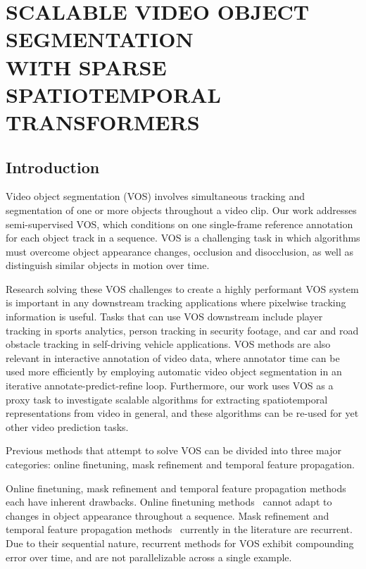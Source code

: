\chapter{SCALABLE VIDEO OBJECT SEGMENTATION \\
         WITH SPARSE SPATIOTEMPORAL TRANSFORMERS}


\section{Introduction}

Video object segmentation (VOS) involves simultaneous tracking and segmentation
of one or more objects throughout a video clip.
Our work addresses semi-supervised VOS, which conditions on one single-frame
reference annotation for each object track in a sequence.
VOS is a challenging task in which algorithms must overcome object appearance
changes, occlusion and disocclusion, as well as distinguish similar objects in
motion over time.

Research solving these VOS challenges to create a highly performant VOS system
is important in any downstream tracking applications where pixelwise tracking
information is useful.
Tasks that can use VOS downstream include player tracking in sports analytics,
person tracking in security footage, and car and road obstacle tracking in
self-driving vehicle applications.
VOS methods are also relevant in interactive annotation of video data, where
annotator time can be used more efficiently by employing automatic video object
segmentation in an iterative annotate-predict-refine loop.
Furthermore, our work uses VOS as a proxy task to investigate scalable
algorithms for extracting spatiotemporal representations from video in general,
and these algorithms can be re-used for yet other video prediction tasks.

Previous methods that attempt to solve VOS can be divided into three major
categories: online finetuning, mask refinement and temporal feature
propagation.

Online finetuning, mask refinement and temporal feature propagation methods
each have inherent drawbacks.
Online finetuning methods~\citep{caelles2017one} cannot adapt to changes in
object appearance throughout a sequence.
Mask refinement and temporal feature propagation methods~\citep{ventura2019rvos}
currently in the literature are recurrent.
Due to their sequential nature, recurrent methods for VOS exhibit compounding
error over time, and are not parallelizable across a single example.

